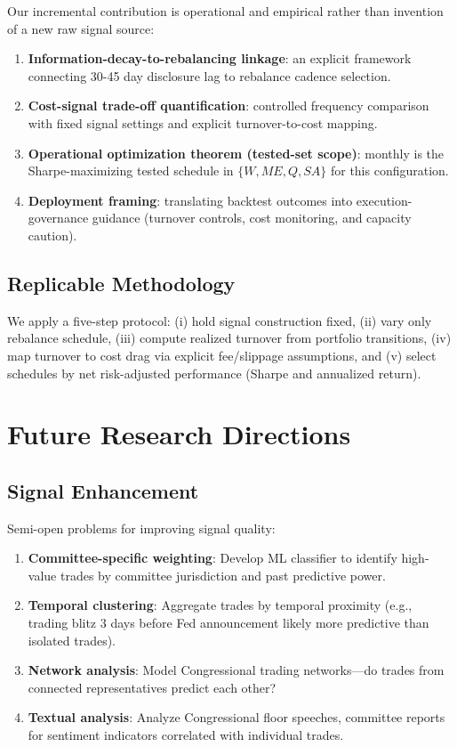 \documentclass[twocolumn,ieee]{Base_Latex_Template/arithmaxresearch}
\begin{document}
Our incremental contribution is operational and empirical rather than invention of a new raw signal source:
\begin{enumerate}
\item \textbf{Information-decay-to-rebalancing linkage}: an explicit framework connecting 30-45 day disclosure lag to rebalance cadence selection.
\item \textbf{Cost-signal trade-off quantification}: controlled frequency comparison with fixed signal settings and explicit turnover-to-cost mapping.
\item \textbf{Operational optimization theorem (tested-set scope)}: monthly is the Sharpe-maximizing tested schedule in $\{W, ME, Q, SA\}$ for this configuration.
\item \textbf{Deployment framing}: translating backtest outcomes into execution-governance guidance (turnover controls, cost monitoring, and capacity caution).
\end{enumerate}

\subsection{Replicable Methodology}

We apply a five-step protocol: (i) hold signal construction fixed, (ii) vary only rebalance schedule, (iii) compute realized turnover from portfolio transitions, (iv) map turnover to cost drag via explicit fee/slippage assumptions, and (v) select schedules by net risk-adjusted performance (Sharpe and annualized return).

\section{Future Research Directions}

\subsection{Signal Enhancement}

Semi-open problems for improving signal quality:

\begin{enumerate}
\item \textbf{Committee-specific weighting}: Develop ML classifier to identify high-value trades by committee jurisdiction and past predictive power.

\item \textbf{Temporal clustering}: Aggregate trades by temporal proximity (e.g., trading blitz 3 days before Fed announcement likely more predictive than isolated trades).

\item \textbf{Network analysis}: Model Congressional trading networks—do trades from connected representatives predict each other?

\item \textbf{Textual analysis}: Analyze Congressional floor speeches, committee reports for sentiment indicators correlated with individual trades.
\end{enumerate}
\end{document}
